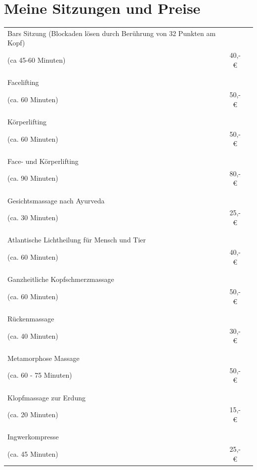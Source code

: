 \documentclass[10pt,foldmark,notumble]{leaflet}
\begin{document}
\section{Meine Sitzungen und Preise}
\begin{tabular}{p{65mm}cr}%
Bars Sitzung (Blockaden lösen durch Berührung von 32 Punkten am Kopf)  &    \\
(ca 45-60 Minuten) &    40,-€  \\
\\
\hline
\\
Facelifting  &    \\
(ca. 60 Minuten) &    50,-€\\
\\
\hline
\\
Körperlifting   &   \\
(ca. 60 Minuten) &    50,-€\\
\\
\hline
\\
Face- und Körperlifting   &    \\
(ca. 90 Minuten) &    80,-€\\
\\
\hline
\\
Gesichtsmassage nach Ayurveda &    \\
(ca. 30 Minuten) &    25,-€ \\
\\
\hline 
\\
Atlantische Lichtheilung für Mensch und Tier  &    \\
(ca. 60 Minuten) &    40,-€ \\
\\
\hline
\\
Ganzheitliche Kopfschmerzmassage &     \\
(ca. 60 Minuten) &    50,-€ \\
\\
\hline
\\
Rückenmassage &    \\
(ca. 40 Minuten) &    30,-€ \\
\\
\hline
\\
Metamorphose Massage  &     \\
(ca. 60 - 75 Minuten) &    50,-€ \\
\\
\hline
\\
Klopfmassage zur Erdung  &    \\
(ca. 20 Minuten) &    15,-€ \\
\\
\hline
\\
Ingwerkompresse  &     \\
(ca. 45 Minuten) &    25,-€ \\

\end{tabular}
\end{document}
